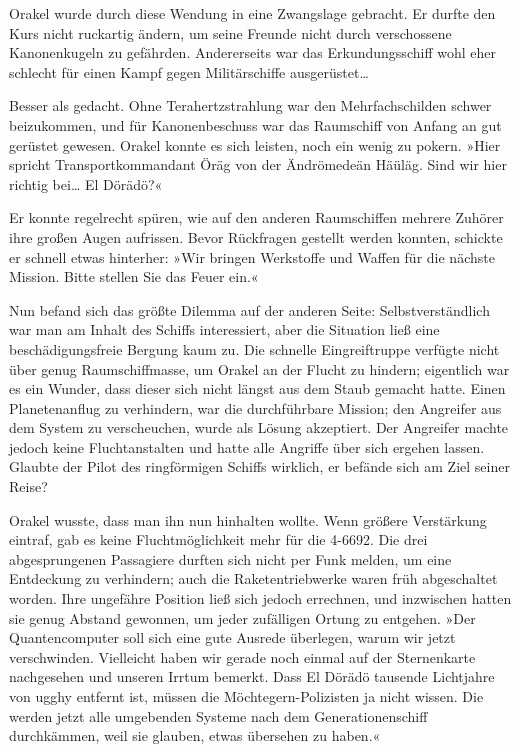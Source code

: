 Orakel wurde durch diese Wendung in eine Zwangslage gebracht. Er durfte den Kurs nicht ruckartig ändern, um seine Freunde nicht durch verschossene Kanonenkugeln zu gefährden. Andererseits war das Erkundungsschiff wohl eher schlecht für einen Kampf gegen Militärschiffe ausgerüstet…


Besser als gedacht. Ohne Terahertzstrahlung war den Mehrfachschilden schwer beizukommen, und für Kanonenbeschuss war das Raumschiff von Anfang an gut gerüstet gewesen. Orakel konnte es sich leisten, noch ein wenig zu pokern. »Hier spricht Transportkommandant Öräg von der Ändrömedeän Häüläg. Sind wir hier richtig bei… El Dörädö?«

Er konnte regelrecht spüren, wie auf den anderen Raumschiffen mehrere Zuhörer ihre großen Augen aufrissen. Bevor Rückfragen gestellt werden konnten, schickte er schnell etwas hinterher: »Wir bringen Werkstoffe und Waffen für die nächste Mission. Bitte stellen Sie das Feuer ein.«

Nun befand sich das größte Dilemma auf der anderen Seite: Selbstverständlich war man am Inhalt des Schiffs interessiert, aber die Situation ließ eine beschädigungsfreie Bergung kaum zu. Die schnelle Eingreiftruppe verfügte nicht über genug Raumschiffmasse, um Orakel an der Flucht zu hindern; eigentlich war es ein Wunder, dass dieser sich nicht längst aus dem Staub gemacht hatte. Einen Planetenanflug zu verhindern, war die durchführbare Mission; den Angreifer aus dem System zu verscheuchen, wurde als Lösung akzeptiert. Der Angreifer machte jedoch keine Fluchtanstalten und hatte alle Angriffe über sich ergehen lassen. Glaubte der Pilot des ringförmigen Schiffs wirklich, er befände sich am Ziel seiner Reise?

Orakel wusste, dass man ihn nun hinhalten wollte. Wenn größere Verstärkung eintraf, gab es keine Fluchtmöglichkeit mehr für die 4-6692. Die drei abgesprungenen Passagiere durften sich nicht per Funk melden, um eine Entdeckung zu verhindern; auch die Raketentriebwerke waren früh abgeschaltet worden. Ihre ungefähre Position ließ sich jedoch errechnen, und inzwischen hatten sie genug Abstand gewonnen, um jeder zufälligen Ortung zu entgehen. »Der Quantencomputer soll sich eine gute Ausrede überlegen, warum wir jetzt verschwinden. Vielleicht haben wir gerade noch einmal auf der Sternenkarte nachgesehen und unseren Irrtum bemerkt. Dass El Dörädö tausende Lichtjahre von ugghy entfernt ist, müssen die Möchtegern-Polizisten ja nicht wissen. Die werden jetzt alle umgebenden Systeme nach dem Generationenschiff durchkämmen, weil sie glauben, etwas übersehen zu haben.«

